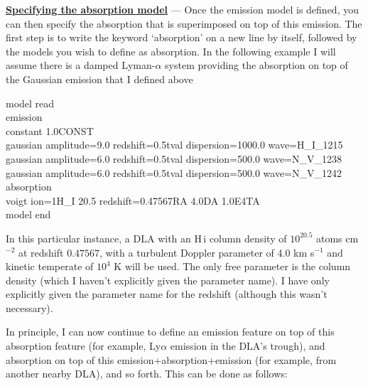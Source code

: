 \textbf{\underline{Specifying the absorption model}} --- Once the emission
model is defined, you can then specify the absorption that is superimposed
on top of this emission. The first step is to write the keyword `absorption' on
a new line by itself, followed by the models you wish to define as absorption.
In the following example I will assume there is a damped Lyman-$\alpha$
system providing the absorption on top of the Gaussian emission that I defined
above

\vspace{0.3cm}
\begin{mdframed}[style=MyFrame]
model read\\
emission\\
constant 1.0CONST\\
gaussian amplitude=9.0 redshift=0.5tval dispersion=1000.0 wave=H\_I\_1215\\
gaussian amplitude=6.0 redshift=0.5tval dispersion=500.0 wave=N\_V\_1238\\
gaussian amplitude=6.0 redshift=0.5tval dispersion=500.0 wave=N\_V\_1242\\
absorption\\
voigt ion=1H\_I    20.5   redshift=0.47567RA    4.0DA   1.0E4TA\\
model end
\end{mdframed}
\vspace{0.2cm}

In this particular instance, a DLA with an H\,{\sc i} column density of
$10^{20.5}$ atoms cm$^{-2}$ at redshift $0.47567$, with a turbulent
Doppler parameter of 4.0 km s$^{-1}$ and kinetic temperate of $10^4$ K
will be used. The only free parameter is the column density (which I haven't
explicitly given the parameter name). I have only explicitly given the parameter
name for the redshift (although this wasn't necessary).

In principle, I can now continue to define an emission feature on top of this
absorption feature (for example, Ly$\alpha$ emission in the DLA's trough),
and absorption on top of this emission+absorption+emission (for example,
from another nearby DLA), and so forth. This can be done as follows:

